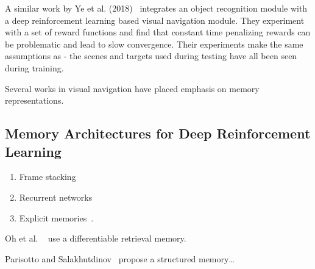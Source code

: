 A similar work by Ye et al. (2018)~\cite{ye_active_2018} integrates an object recognition module with a deep reinforcement learning based visual navigation module.
They experiment with a set of reward functions and find that constant time penalizing rewards can be problematic and lead to slow convergence.
Their experiments make the same assumptions as \cite{zhu_target_driven} - the scenes and targets used during testing have all been seen during training.

Several works in visual navigation have placed emphasis on memory representations.~\cite{savinov_topmem_2018} %

\subsection{Memory Architectures for Deep Reinforcement Learning}

\begin{enumerate}
    \item Frame stacking
    \item Recurrent networks
    \item Explicit memories~\cite{oh_minecraft_2016,parisotto_salakhutdinov_2017}.
\end{enumerate}


Oh et al. ~\cite{oh_minecraft_2016} use a differentiable retrieval memory.

Parisotto and Salakhutdinov~\cite{parisotto_salakhutdinov_2017} propose a structured memory\dots %



